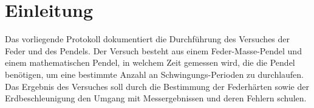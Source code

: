 \section{Einleitung}
Das vorliegende Protokoll dokumentiert die Durchführung des Versuches der Feder und des Pendels.
Der Versuch besteht aus einem Feder-Masse-Pendel und einem mathematischen Pendel, in welchem Zeit gemessen wird, die die Pendel benötigen, um eine bestimmte Anzahl an Schwingungs-Perioden zu durchlaufen.
Das Ergebnis des Versuches soll durch die Bestimmung der Federhärten sowie der Erdbeschleunigung den Umgang mit Messergebnissen und deren Fehlern schulen.